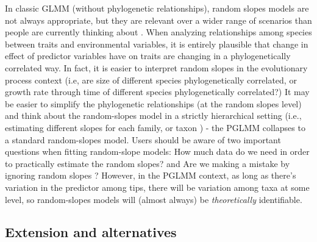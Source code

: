\documentclass[12pt]{article}
\begin{document}
In classic GLMM (without phylogenetic relationships), random slopes models are not always appropriate, but they are relevant over a wider range of scenarios than people are currently thinking about \cite{schielzeth2008conclusions, cleasby2015quantifying,ord2010adaptation}.
When analyzing relationships among species between traits and environmental variables, it is entirely plausible that change in effect of predictor variables have on traits are changing in a phylogenetically correlated way.
In fact, it is easier to interpret random slopes in the evolutionary process context (i.e, are size of different species phylogenetically correlated, or growth rate through time of different species phylogenetically correlated?)
It may be easier to simplify the phylogenetic relationships (at the random slopes level) and think about the random-slopes model in a strictly hierarchical setting (i.e., estimating different slopes for each family, or taxon \cite{bunnefeld2012island}) - the PGLMM collapses to a standard random-slopes model. 
Users should be aware of two important questions when fitting random-slope models: How much data do we need in order to practically estimate the random slopes? and Are we making a mistake by ignoring random slopes \cite{schielzeth2008conclusions}? 
However, in the PGLMM context, as long as there's variation in the predictor among tips, there will be variation among taxa at some level, so random-slopes models will (almost always) be \emph{theoretically} identifiable.


\subsection{Extension and alternatives}
\end{document}
